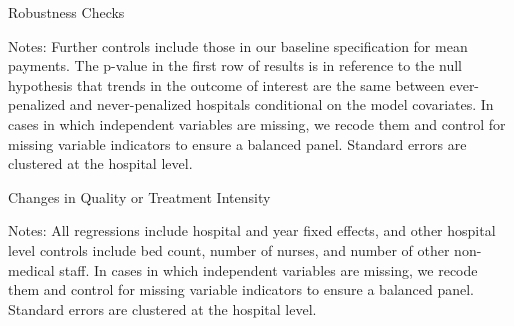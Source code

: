 \documentclass[12pt]{article}
\begin{document}
\setlength{\captionmargin}{.5 \textwidth} \addtolength{\captionmargin}{-.5\wd\gfxbox}
\begin{table}[htbp!]
\centering
\caption{Robustness Checks}
\label{tab:robustness}
\usebox{\gfxbox}
\par
\begin{minipage}{\wd\gfxbox}
\footnotesize
Notes: Further controls include those in our baseline specification for mean payments.  The p-value in the first row of results is in reference to the null hypothesis that trends in the outcome of interest are the same between ever-penalized and never-penalized hospitals conditional on the model covariates.  In cases in which independent variables are missing, we recode them and control for missing variable indicators to ensure a balanced panel.  Standard errors are clustered at the hospital level.
\end{minipage}
\end{table}


\newpage
{}
\setlength{\captionmargin}{.5 \textwidth} \addtolength{\captionmargin}{-.5\wd\gfxbox}
\begin{table}[htbp!]
\centering
\caption{Changes in Quality or Treatment Intensity}
\label{tab:other_results}
\usebox{\gfxbox}
\par
\begin{minipage}{\wd\gfxbox}
\footnotesize
Notes: All regressions include hospital and year fixed effects, and other hospital level controls include bed count, number of nurses, and number of other non-medical staff. In cases in which independent variables are missing, we recode them and control for missing variable indicators to ensure a balanced panel.  Standard errors are clustered at the hospital level.
\end{minipage}
\end{table}
\end{document}

